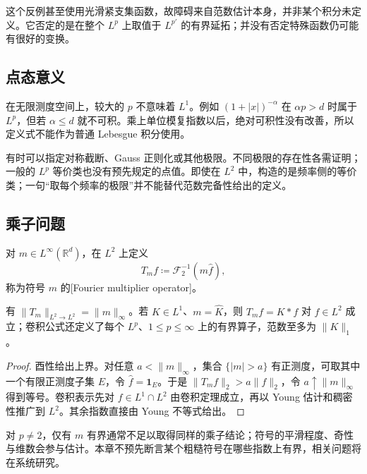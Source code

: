 这个反例甚至使用光滑紧支集函数，故障碍来自范数估计本身，并非某个积分未定义。它否定的是在整个 \(L^p\) 上取值于 \(L^{p'}\) 的有界延拓；并没有否定特殊函数仍可能有很好的变换。

\subsection{点态意义}
\label{b2:subsec:040302}

在无限测度空间上，较大的 \(p\) 不意味着 \(L^1\)。例如 \((1+|x|)^{-\alpha}\) 在 \(\alpha p>d\) 时属于 \(L^p\)，但若 \(\alpha\leq d\) 就不可积。乘上单位模复指数以后，绝对可积性没有改善，所以定义式不能作为普通 Lebesgue 积分使用。

\ProseParagraphBreak

有时可以指定对称截断、Gauss 正则化或其他极限。不同极限的存在性各需证明；一般的 \(L^p\) 等价类也没有预先规定的点值。即使在 \(L^2\) 中，构造的是频率侧的等价类；一句“取每个频率的极限”并不能替代范数完备性给出的定义。

\subsection{乘子问题}
\label{b2:subsec:040303}

\begin{definition}\label{b2:def:04-multiplier}
对 \(m\in L^\infty(\mathbb R^d)\)，在 \(L^2\) 上定义
\[
 T_mf\coloneqq\mathcal F_2^{-1}(m\widehat f),
\]
称为符号 \(m\) 的[Fourier multiplier operator]。
\end{definition}

\begin{proposition}\label{b2:prop:04-multiplier-norm}
有 \(\|T_m\|_{L^2\to L^2}=\|m\|_\infty\)。若 \(K\in L^1\)、\(m=\widehat K\)，则 \(T_mf=K*f\) 对 \(f\in L^2\) 成立；卷积公式还定义了每个 \(L^p\)、\(1\leq p\leq\infty\) 上的有界算子，范数至多为 \(\|K\|_1\)。
\end{proposition}
\begin{proof}
酉性给出上界。对任意 \(a<\|m\|_\infty\)，集合 \(\{|m|>a\}\) 有正测度，可取其中一个有限正测度子集 \(E\)，令 \(\widehat f=\mathbf1_E\)。于是 \(\|T_mf\|_2>a\|f\|_2\)，令 \(a\uparrow\|m\|_\infty\) 得到等号。卷积表示先对 \(f\in L^1\cap L^2\) 由卷积定理成立，再以 Young 估计和稠密性推广到 \(L^2\)。其余指数直接由 Young 不等式给出。
\end{proof}

对 \(p\ne2\)，仅有 \(m\) 有界通常不足以取得同样的乘子结论；符号的平滑程度、奇性与维数会参与估计。本章不预先断言某个粗糙符号在哪些指数上有界，相关问题将在系统研究。


